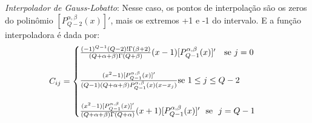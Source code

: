  \emph{Interpolador de Gauss-Lobatto}: Nesse caso, os pontos de interpolação são os zeros do polinômio $[P^{\alpha,\beta}_{Q-2}(x)]'$, mais os extremos +1 e -1 do intervalo. E a função interpoladora é dada por:
\begin{equation}
 C_{ij}= 
\begin{cases}
 \frac{(-1)^{Q - 1}(Q-2)!\Gamma(\beta +2)}{(Q + \alpha + \beta)\Gamma(Q + \beta)}(x-1)[P^{\alpha,\beta}_{Q-1}(x)]'\  \  \ \text{se}\  j = 0 \\\\
 \frac{(x^2 -1)[P^{\alpha,\beta}_{Q-1}(x)]'}{(Q-1)(Q + \alpha + \beta)P^{\alpha,\beta}_{Q-1}(x)(x-x_j)} \text{se}\  1 \leq j \leq Q-2\\\\
 \frac{(x^2 -1)[P^{\alpha,\beta}_{Q-1}(x)]'}{(Q + \alpha + \beta)\Gamma(Q+\alpha)}(x+1)[P^{\alpha,\beta}_{Q-1}(x)]' \ \ \text{se} \ \ j = Q - 1
\end{cases}\\
\end{equation} 

